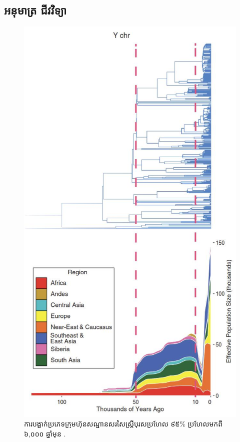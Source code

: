 \documentclass[10pt,twocolumn,letterpaper]{article}
\begin{document}
\subsection{អនុមាត្រ ជីវវិទ្យា}

\begin{figure}[b]
\begin{center}
   \includegraphics[width=1\linewidth]{bottleneck.jpg}
\end{center}
   \caption{ការបង្អាក់ប្រភេទក្រុមហ៊ុនសណ្ឋានសរសៃស្ត្រីបុរសប្រហែល ៩៥\% ប្រហែលមកពី ៦,០០០ ឆ្នាំមុន \cite{62}.}
\label{fig:10}
\label{fig:onecol}
\end{figure}
\end{document}

